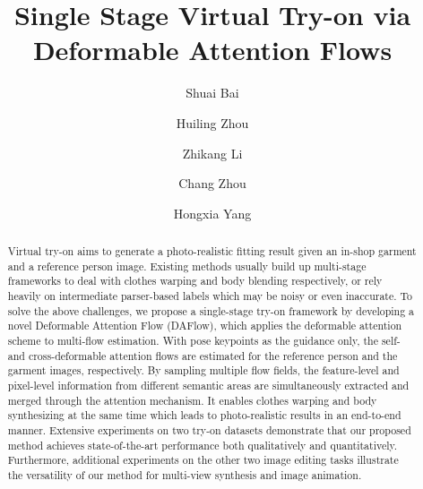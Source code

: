 \documentclass[runningheads]{llncs}
\begin{document}
\pagestyle{headings}
\mainmatter
\def\ECCVSubNumber{2221}  

\title{Single Stage Virtual Try-on via Deformable Attention Flows} 

\begin{comment}
\titlerunning{ECCV-22 submission ID \ECCVSubNumber} 
\authorrunning{ECCV-22 submission ID \ECCVSubNumber} 
\author{Anonymous ECCV submission}
\institute{Paper ID \ECCVSubNumber}
\end{comment}


\author{Shuai Bai \and
Huiling Zhou \and
Zhikang Li \and
Chang Zhou \and
Hongxia Yang}


\maketitle

\begin{abstract}
Virtual try-on aims to generate a photo-realistic fitting result given an in-shop garment and a reference person image. Existing methods usually build up multi-stage frameworks to deal with clothes warping and body blending respectively, or rely heavily on intermediate parser-based labels which may be noisy or even inaccurate. To solve the above challenges, we propose a single-stage try-on framework by developing a novel Deformable Attention Flow (DAFlow), which applies the deformable attention scheme to multi-flow estimation. With pose keypoints as the guidance only, the self- and cross-deformable attention flows are estimated for the reference person and the garment images, respectively. By sampling multiple flow fields, the feature-level and pixel-level information from different semantic areas are simultaneously extracted and merged through the attention mechanism. It enables clothes warping and body synthesizing at the same time which leads to photo-realistic results in an end-to-end manner. Extensive experiments on two try-on datasets demonstrate that our proposed method achieves state-of-the-art performance both qualitatively and quantitatively. Furthermore, additional experiments on the other two image editing tasks illustrate the versatility of our method for multi-view synthesis and image animation.

\end{abstract}
\end{document}
